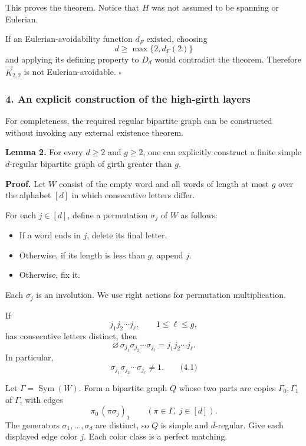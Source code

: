 \documentclass[
  11pt,
  a4paper,
]{article}
\providecommand{\tightlist}{%
  \setlength{\itemsep}{0pt}\setlength{\parskip}{0pt}}
\begin{document}
This proves the theorem. Notice that \(H\) was not assumed to be
spanning or Eulerian.

If an Eulerian-avoidability function \(d_F\) existed, choosing \[
d\ge\max\{2,d_F(2)\}
\] and applying its defining property to \(D_d\) would contradict the
theorem. Therefore \(\vec K_{2,2}\) is not Eulerian-avoidable.
\(\square\)

\subsubsection{4. An explicit construction of the high-girth
layers}\label{an-explicit-construction-of-the-high-girth-layers}

For completeness, the required regular bipartite graph can be
constructed without invoking any external existence theorem.

\textbf{Lemma 2.} For every \(d\ge2\) and \(g\ge2\), one can explicitly
construct a finite simple \(d\)-regular bipartite graph of girth greater
than \(g\).

\textbf{Proof.} Let \(W\) consist of the empty word and all words of
length at most \(g\) over the alphabet \([d]\) in which consecutive
letters differ.

For each \(j\in[d]\), define a permutation \(\sigma_j\) of \(W\) as
follows:

\begin{itemize}
\tightlist
\item
  If a word ends in \(j\), delete its final letter.
\item
  Otherwise, if its length is less than \(g\), append \(j\).
\item
  Otherwise, fix it.
\end{itemize}

Each \(\sigma_j\) is an involution. We use right actions for permutation
multiplication.

If \[
j_1j_2\cdots j_\ell,\qquad 1\le\ell\le g,
\] has consecutive letters distinct, then \[
\varnothing\,\sigma_{j_1}\sigma_{j_2}\cdots\sigma_{j_\ell}
=j_1j_2\cdots j_\ell.
\] In particular, \[
\sigma_{j_1}\sigma_{j_2}\cdots\sigma_{j_\ell}\ne 1.
\qquad\text{(4.1)}
\]

Let \(\Gamma=\operatorname{Sym}(W)\). Form a bipartite graph \(Q\) whose
two parts are copies \(\Gamma_0,\Gamma_1\) of \(\Gamma\), with edges \[
\pi_0\,(\pi\sigma_j)_1
\qquad
(\pi\in\Gamma,\ j\in[d]).
\] The generators \(\sigma_1,\ldots,\sigma_d\) are distinct, so \(Q\) is
simple and \(d\)-regular. Give each displayed edge color \(j\). Each
color class is a perfect matching.
\end{document}
